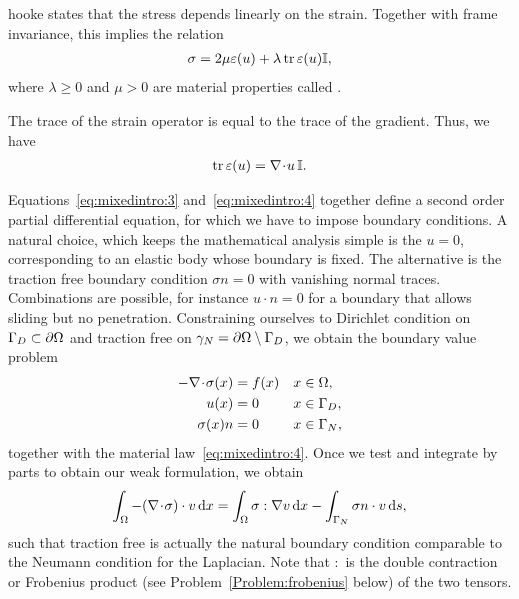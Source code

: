 \begin{Definition}{hooke}
   states that the stress depends linearly on the
  strain. Together with frame invariance, this implies the relation
  \begin{gather}
    \label{eq:mixedintro:4}
    \sigma = 2\mu \varepsilon(u) + \lambda \operatorname{tr} \varepsilon(u) \mathbb I,
  \end{gather}
  where $\lambda\ge 0$ and $\mu> 0$ are material properties called
  .
\end{Definition}

\begin{remark}
  The trace of the strain operator is equal to the trace of the
  gradient. Thus, we have
  \begin{gather}
    \label{eq:mixedintro:5}
    \operatorname{tr} \varepsilon(u) = \nabla\!\cdot\! u \,\mathbb I.
  \end{gather}
\end{remark}

\begin{intro}
  Equations~\eqref{eq:mixedintro:3} and~\eqref{eq:mixedintro:4}
  together define a second order partial differential equation, for
  which we have to impose boundary conditions. A natural choice, which
  keeps the mathematical analysis simple is the  $u=0$, corresponding to an elastic body whose
  boundary is fixed. The alternative is the traction free boundary
  condition $\sigma n=0$ with vanishing normal traces. Combinations
  are possible, for instance $u\cdot n=0$ for a boundary that allows
  sliding but no penetration. Constraining ourselves to Dirichlet
  condition on $\Gamma_D\subset \partial\Omega$ and traction free on
  $\gamma_N = \partial\Omega\setminus\Gamma_D$, we obtain the
  boundary value problem
  \begin{gather}
    \label{eq:mixedintro:lame-navier-bvp}
    \begin{aligned}
      -\nabla\!\cdot\! \sigma(x) &= f(x) & x&\in\Omega,\\
      u(x) &= 0 & x&\in\Gamma_D, \\
      \sigma(x)n &=0& x&\in\Gamma_N,
    \end{aligned}
  \end{gather}
  together with the material law~\eqref{eq:mixedintro:4}.  Once we
  test and integrate by parts to obtain our weak formulation, we
  obtain
  \begin{gather}
    \int_{\Omega} -(\nabla\!\cdot\! \sigma) \cdot v\,\mathrm{d} x
    = \int_{\Omega} \sigma : \nabla v\,\mathrm{d} x
    - \int_{\Gamma_N} \sigma n\cdot v\,\mathrm{d} s,
  \end{gather}
  such that traction free is actually the natural boundary condition
  comparable to the Neumann condition for the Laplacian. Note that $:$
  is the double contraction or Frobenius product (see
  Problem~\ref{Problem:frobenius} below) of the two tensors.
\end{intro}

